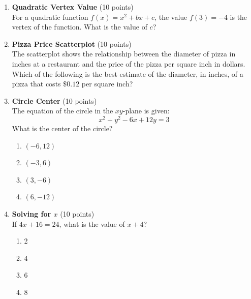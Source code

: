 \begin{enumerate}
  \newpage

  \item \textbf{Quadratic Vertex Value} (10 points)\\
  For a quadratic function $f(x) = x^2 + bx + c$, the value $f(3) = -4$ is the vertex of the function. What is the value of $c$?
  \begin{subanswer}
  \end{subanswer}

  \item \textbf{Pizza Price Scatterplot} (10 points)\\
  The scatterplot shows the relationship between the diameter of pizza in inches at a restaurant and the price of the pizza per square inch in dollars.
  Which of the following is the best estimate of the diameter, in inches, of a pizza that costs $\$ 0.12$ per square inch?
  \begin{subanswer}
  \end{subanswer}

  \item \textbf{Circle Center} (10 points)\\
  The equation of the circle in the $xy$-plane is given:
  \[
    x^2 + y^2 - 6x + 12y = 3
  \]
  What is the center of the circle?
  \begin{enumerate}[label=\Alph*.]
    \item $(-6, 12)$
    \item $(-3, 6)$
    \item $(3, -6)$
    \item $(6, -12)$
  \end{enumerate}
  \begin{subanswer}
  \end{subanswer}

  \item \textbf{Solving for $x$} (10 points)\\
  If $4x + 16 = 24$, what is the value of $x + 4$?
  \begin{enumerate}[label=\Alph*.]
    \item 2
    \item 4
    \item 6
    \item 8
  \end{enumerate}
  \begin{subanswer}
  \end{subanswer}


\end{enumerate}
